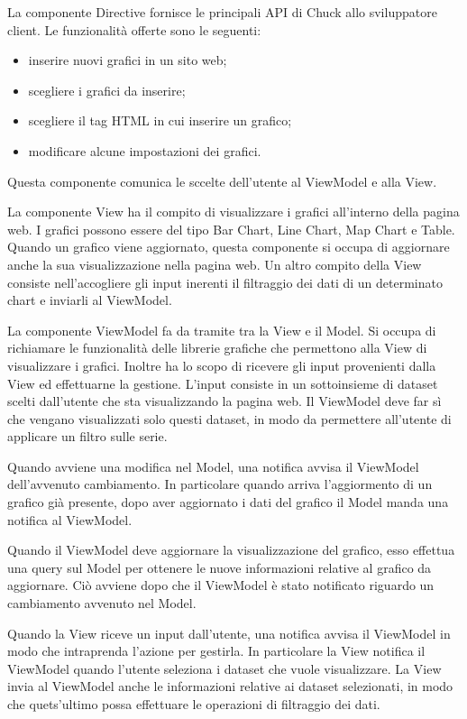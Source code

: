 			La componente Directive fornisce le principali API di Chuck allo sviluppatore client. Le funzionalità offerte sono le seguenti:
			\begin{itemize}
				\item inserire nuovi grafici in un sito web;
				\item scegliere i grafici da inserire;
				\item scegliere il tag HTML in cui inserire un grafico;
				\item modificare alcune impostazioni dei grafici.
			\end{itemize}
			Questa componente comunica le sccelte dell'utente al ViewModel e alla View.
    		
			La componente View ha il compito di visualizzare i grafici all'interno della pagina web. I grafici possono essere del tipo Bar Chart, Line Chart, Map Chart e Table. Quando un grafico viene aggiornato, questa componente si occupa di aggiornare anche la sua visualizzazione nella pagina web. Un altro compito della View consiste nell'accogliere gli input inerenti il filtraggio dei dati di un determinato chart e inviarli al ViewModel.
			
			La componente ViewModel fa da tramite tra la View e il Model. Si occupa di richiamare le funzionalità delle librerie grafiche che permettono alla View di visualizzare i grafici. Inoltre ha lo scopo di ricevere gli input provenienti dalla View ed effettuarne la gestione. L'input consiste in un sottoinsieme di dataset scelti dall'utente che sta visualizzando la pagina web. Il ViewModel deve far sì che vengano visualizzati solo questi dataset, in modo da permettere all'utente di applicare un filtro sulle serie.
			    
			Quando avviene una modifica nel Model, una notifica avvisa il ViewModel dell'avvenuto cambiamento. In particolare quando arriva l'aggiormento di un grafico già presente, dopo aver aggiornato i dati del grafico il Model manda una notifica al ViewModel.

			Quando il ViewModel deve aggiornare la visualizzazione del grafico, esso effettua una query sul Model per ottenere le nuove informazioni relative al grafico da aggiornare. Ciò avviene dopo che il ViewModel è stato notificato riguardo un cambiamento avvenuto nel Model. 
			
			Quando la View riceve un input dall'utente, una notifica avvisa il ViewModel in modo che intraprenda l'azione per gestirla. In particolare la View notifica il ViewModel quando l'utente seleziona i dataset che vuole visualizzare. La View invia al ViewModel anche le informazioni relative ai dataset selezionati, in modo che quets'ultimo possa effettuare le operazioni di filtraggio dei dati.
			
